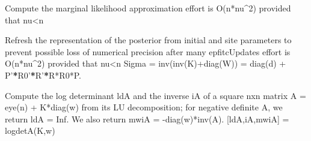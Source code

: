 \documentclass[letterpaper,10pt,english]{sphinxmanual}
\begin{document}
\begin{fulllineitems}
\begin{fulllineitems}
\end{fulllineitems}


\begin{fulllineitems}
\label{pyGPs.Core:pyGPs.Core.inf.Inference.epfitcUpdate}
\end{fulllineitems}


\begin{fulllineitems}
\label{pyGPs.Core:pyGPs.Core.inf.Inference.epfitcZ}
Compute the marginal likelihood approximation
effort is O(n*nu\textasciicircum{}2) provided that nu\textless{}n

\end{fulllineitems}


\begin{fulllineitems}
\label{pyGPs.Core:pyGPs.Core.inf.Inference.fitcRefresh}
Refresh the representation of the posterior from initial and site parameters
to prevent possible loss of numerical precision after many epfitcUpdates
effort is O(n*nu\textasciicircum{}2) provided that nu\textless{}n
Sigma = inv(inv(K)+diag(W)) = diag(d) + P'{\color{red}\bfseries{}*}R0'{\color{red}\bfseries{}*}R'{\color{red}\bfseries{}*}R*R0*P.

\end{fulllineitems}


\begin{fulllineitems}
\label{pyGPs.Core:pyGPs.Core.inf.Inference.logdetA}
Compute the log determinant ldA and the inverse iA of a square nxn matrix
A = eye(n) + K*diag(w) from its LU decomposition; for negative definite A, we 
return ldA = Inf. We also return mwiA = -diag(w)*inv(A).
{[}ldA,iA,mwiA{]} = logdetA(K,w)


\end{fulllineitems}
\end{fulllineitems}
\end{document}
